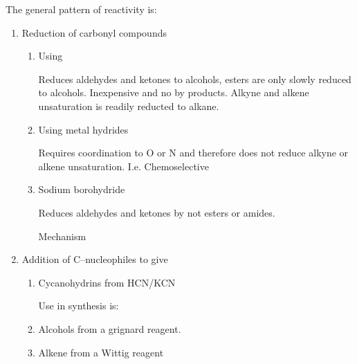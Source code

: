 The general pattern of reactivity is:


\begin{enumerate}[label=\alph*)]

  \item Reduction of carbonyl compounds

    \begin{enumerate}[label=\roman*)]

      \item Using 

        Reduces aldehydes and ketones to alcohols, esters are only slowly
        reduced to alcohols. Inexpensive and no by products. Alkyne and alkene
        unsaturation is readily reducted to alkane.


      \item Using metal hydrides

        Requires coordination to O or N and therefore does not reduce alkyne
        or alkene unsaturation. I.e. Chemoselective


      \item Sodium borohydride

        Reduces aldehydes and ketones by not esters or amides.


        Mechanism


    \end{enumerate}

  \item Addition of C--nucleophiles to give

    \begin{enumerate}[label=\roman*)]

      \item Cycanohydrins from HCN/KCN


        Use in synthesis is:


      \item Alcohols from a grignard reagent.

      \item Alkene from a Wittig reagent



\end{enumerate}
\end{enumerate}
